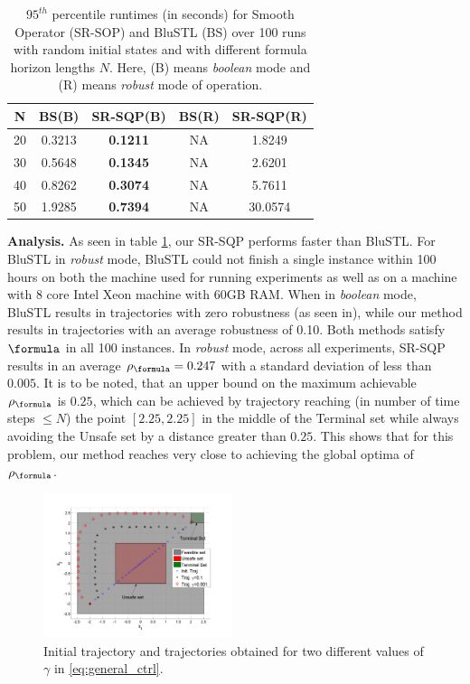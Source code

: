 \begin{table}[tb]
\small
\begin{center}
\caption{{\small $95^{th}$ percentile runtimes (in seconds) for Smooth Operator (SR-SOP) and BluSTL (BS) over 100 runs with random initial states and with different formula horizon lengths $N$. Here, (B) means \textit{boolean} mode and (R) means \textit{robust} mode of operation.}}
\vspace{-5pt}
\label{tbl:time_performance_toy}
\begin{tabular} {|c|c|c|c|c|}
	\hline
	N & BS(B) & SR-SQP(B) & BS(R) & SR-SQP(R) \\ \hline
	20 & 0.3213 &  \textbf{0.1211} & NA & 1.8249 \\ \hline
	30 & 0.5648 &  \textbf{0.1345} & NA & 2.6201\\ \hline
	40 & 0.8262 &  \textbf{0.3074} & NA & 5.7611\\ \hline
	50 & 1.9285  & \textbf{0.7394} & NA & 30.0574\\ \hline
\end{tabular}	
\end{center}
\end{table}

\textbf{Analysis.}
As seen in table \ref{tbl:time_performance_toy}, our SR-SQP performs faster than BluSTL. For BluSTL in \textit{robust} mode, BluSTL could not finish a single instance within 100 hours on both the machine used for running experiments as well as on a machine with 8 core Intel Xeon machine with 60GB RAM.
When in \textit{boolean} mode, BluSTL results in trajectories with zero robustness (as seen in), while our method results in trajectories with an average robustness of 0.10. Both methods satisfy $\formula$ in all 100 instances. In \textit{robust} mode, across all experiments, SR-SQP results in an average $\rob_{\formula}=0.247$ with a standard deviation of less than $0.005$. It is to be noted, that an upper bound on the maximum achievable $\rob_{\formula}$ is $0.25$, which can be achieved by trajectory reaching (in number of time steps $\leq N$) the point $[2.25,2.25]$ in the middle of the Terminal set while always avoiding the Unsafe set by a distance greater than $0.25$. This shows that for this problem, our method reaches very close to achieving the global optima of $\rob_{\formula}$.

\begin{figure}[t]
\centering
\includegraphics[width=0.49\textwidth]{figures/ToyExampleControl}
\vspace{-30pt}
\caption{{\small Initial trajectory and trajectories obtained for two different values of $\gamma$ in \eqref{eq:general_ctrl}.}}
\label{fig:toy control}
\vspace{-10pt}
\end{figure}